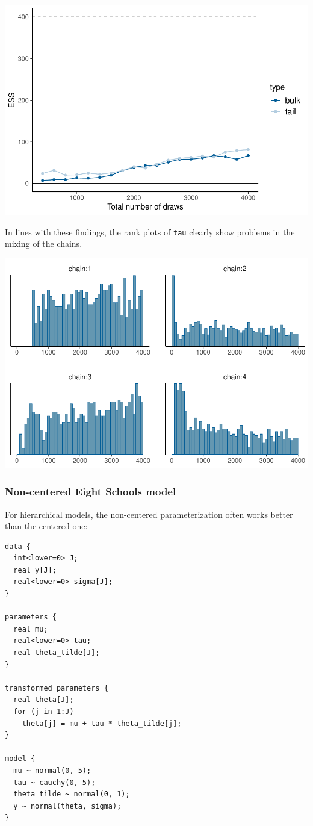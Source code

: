 \documentclass[american,]{article}
\begin{document}
\includegraphics{graphics/change-ess-fit-cp-1.pdf}

In lines with these findings, the rank plots of \texttt{tau} clearly
show problems in the mixing of the chains.

\includegraphics{graphics/hist-fit-cp-1.pdf}

\hypertarget{non-centered-eight-schools-model}{%
\subsubsection{Non-centered Eight Schools
model}\label{non-centered-eight-schools-model}}

For hierarchical models, the non-centered parameterization often works
better than the centered one:

\begin{verbatim}
data {
  int<lower=0> J;
  real y[J];
  real<lower=0> sigma[J];
}

parameters {
  real mu;
  real<lower=0> tau;
  real theta_tilde[J];
}

transformed parameters {
  real theta[J];
  for (j in 1:J)
    theta[j] = mu + tau * theta_tilde[j];
}

model {
  mu ~ normal(0, 5);
  tau ~ cauchy(0, 5);
  theta_tilde ~ normal(0, 1);
  y ~ normal(theta, sigma);
}
\end{verbatim}
\end{document}
